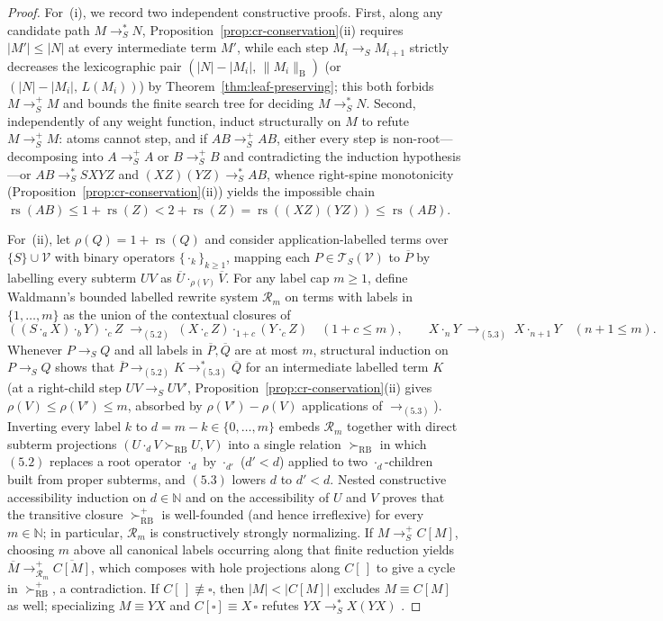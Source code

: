\documentclass[11pt,reqno]{amsart}
\numberwithin{equation}{section}
\theoremstyle{plain}
\theoremstyle{definition}
\theoremstyle{remark}
\DeclareMathOperator{\rs}{rs}
\newcommand{\TSV}{\mathcal{T}_S(\mathcal{V})}
\newcommand{\redS}{\to_S}
\newcommand{\redSp}{\to_S^+}
\newcommand{\redSs}{\to_S^*}
\begin{document}
\begin{proof}
For~(i), we record two independent constructive proofs. First, along any candidate path $M \redSs N$, Proposition~\ref{prop:cr-conservation}(ii) requires $|M'| \le |N|$ at every intermediate term $M'$, while each step $M_i \redS M_{i+1}$ strictly decreases the lexicographic pair $(|N| - |M_i|,\, \|M_i\|_{\mathrm{B}})$ (or $(|N| - |M_i|,\, L(M_i))$) by Theorem~\ref{thm:leaf-preserving}; this both forbids $M \redSp M$ and bounds the finite search tree for deciding $M \redSs N$. Second, independently of any weight function, induct structurally on $M$ to refute $M \redSp M$: atoms cannot step, and if $A B \redSp A B$, either every step is non-root---decomposing into $A \redSp A$ or $B \redSp B$ and contradicting the induction hypothesis---or $A B \redSs S X Y Z$ and $(X Z)(Y Z) \redSs A B$, whence right-spine monotonicity (Proposition~\ref{prop:cr-conservation}(ii)) yields the impossible chain $\rs(A B) \le 1 + \rs(Z) < 2 + \rs(Z) = \rs((X Z)(Y Z)) \le \rs(A B)$.

For~(ii), let $\rho(Q) = 1 + \rs(Q)$ and consider application-labelled terms over $\{S\} \cup \mathcal{V}$ with binary operators $\{\cdot_k\}_{k \ge 1}$, mapping each $P \in \TSV$ to $\overline{P}$ by labelling every subterm $U V$ as $\overline{U} \cdot_{\rho(V)} \overline{V}$. For any label cap $m \ge 1$, define Waldmann's bounded labelled rewrite system $\mathcal{R}_m$ on terms with labels in $\{1, \dots, m\}$ as the union of the contextual closures of
\[
  ((S \cdot_a X) \cdot_b Y) \cdot_c Z \;\to_{(5.2)}\; (X \cdot_c Z) \cdot_{1+c} (Y \cdot_c Z) \quad (1 + c \le m), \qquad
  X \cdot_n Y \;\to_{(5.3)}\; X \cdot_{n+1} Y \quad (n + 1 \le m).
\]
Whenever $P \redS Q$ and all labels in $\overline{P}, \overline{Q}$ are at most $m$, structural induction on $P \redS Q$ shows that $\overline{P} \to_{(5.2)} K \to_{(5.3)}^* \overline{Q}$ for an intermediate labelled term $K$ (at a right-child step $U V \redS U V'$, Proposition~\ref{prop:cr-conservation}(ii) gives $\rho(V) \le \rho(V') \le m$, absorbed by $\rho(V') - \rho(V)$ applications of $\to_{(5.3)}$). Inverting every label $k$ to $d = m - k \in \{0, \dots, m\}$ embeds $\mathcal{R}_m$ together with direct subterm projections $(U \cdot_d V \succ_{\mathrm{RB}} U, V)$ into a single relation $\succ_{\mathrm{RB}}$ in which $(5.2)$ replaces a root operator $\cdot_d$ by $\cdot_{d'}$ ($d' < d$) applied to two $\cdot_d$-children built from proper subterms, and $(5.3)$ lowers $d$ to $d' < d$. Nested constructive accessibility induction on $d \in \mathbb{N}$ and on the accessibility of $U$ and $V$ proves that the transitive closure $\succ_{\mathrm{RB}}^+$ is well-founded (and hence irreflexive) for every $m \in \mathbb{N}$; in particular, $\mathcal{R}_m$ is constructively strongly normalizing. If $M \redSp C[M]$, choosing $m$ above all canonical labels occurring along that finite reduction yields $\overline{M} \to_{\mathcal{R}_m}^+ \overline{C[M]}$, which composes with hole projections along $C[\,]$ to give a cycle in $\succ_{\mathrm{RB}}^+$, a contradiction. If $C[\,] \not\equiv \square$, then $|M| < |C[M]|$ excludes $M \equiv C[M]$ as well; specializing $M \equiv Y X$ and $C[\square] \equiv X\,\square$ refutes $Y X \redSs X(Y X)$ \cite[Remark~15]{BarendregtEndrullisKlopWaldmann2017}.


\end{proof}
\end{document}
